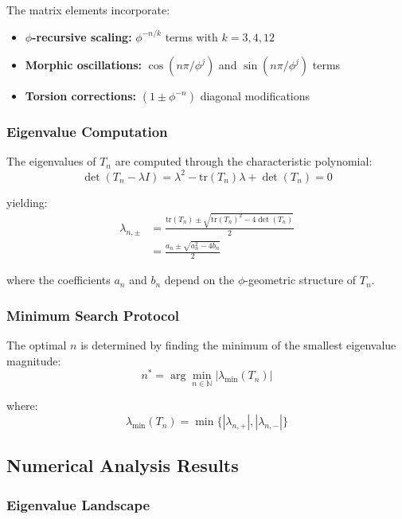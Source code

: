 The matrix elements incorporate:
\begin{itemize}
\item \textbf{$\phi$-recursive scaling:} $\phi^{-n/k}$ terms with $k = 3, 4, 12$
\item \textbf{Morphic oscillations:} $\cos(n\pi/\phi^j)$ and $\sin(n\pi/\phi^j)$ terms
\item \textbf{Torsion corrections:} $(1 \pm \phi^{-n})$ diagonal modifications
\end{itemize}

\subsubsection{Eigenvalue Computation}

The eigenvalues of $T_n$ are computed through the characteristic polynomial:
\begin{equation}
\det(T_n - \lambda I) = \lambda^2 - \text{tr}(T_n)\lambda + \det(T_n) = 0
\end{equation}

yielding:
\begin{align}
\lambda_{n,\pm} &= \frac{\text{tr}(T_n) \pm \sqrt{\text{tr}(T_n)^2 - 4\det(T_n)}}{2}\\
&= \frac{a_n \pm \sqrt{a_n^2 - 4b_n}}{2}
\end{align}

where the coefficients $a_n$ and $b_n$ depend on the $\phi$-geometric structure of $T_n$.

\subsubsection{Minimum Search Protocol}

The optimal $n$ is determined by finding the minimum of the smallest eigenvalue magnitude:
\begin{equation}
n^* = \arg\min_{n \in \mathbb{N}} |\lambda_{\text{min}}(T_n)|
\end{equation}

where:
\begin{equation}
\lambda_{\text{min}}(T_n) = \min\{|\lambda_{n,+}|, |\lambda_{n,-}|\}
\end{equation}

\subsection{Numerical Analysis Results}

\subsubsection{Eigenvalue Landscape}

